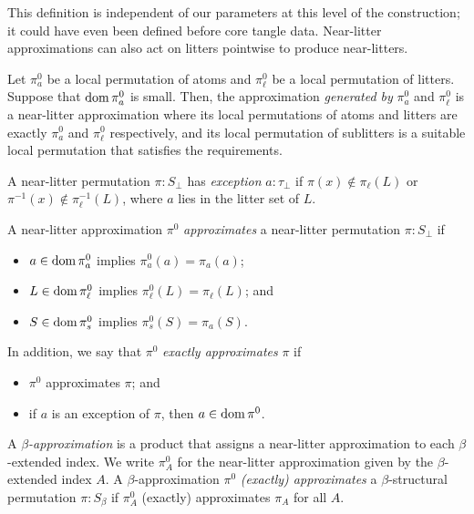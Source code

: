 \documentclass{article}
\begin{document}
\begin{remark}
    This definition is independent of our parameters at this level of the construction; it could have even been defined before core tangle data.
    Near-litter approximations can also act on litters pointwise to produce near-litters.
\end{remark}
\begin{definition}
    Let \( \pi^0_a \) be a local permutation of atoms and \( \pi^0_\ell \) be a local permutation of litters.
    Suppose that \( \operatorname{dom} \pi^0_a \) is small.
    Then, the approximation \emph{generated by} \( \pi^0_a \) and \( \pi^0_\ell \) is a near-litter approximation where its local permutations of atoms and litters are exactly \( \pi^0_a \) and \( \pi^0_\ell \) respectively, and its local permutation of sublitters is a suitable local permutation that satisfies the requirements.
\end{definition}
\begin{definition}
    A near-litter permutation \( \pi : S_\bot \) has \emph{exception} \( a : \tau_\bot \) if \( \pi(x) \not\in \pi_\ell(L) \) or \( \pi^{-1}(x) \not\in \pi^{-1}_\ell(L) \), where \( a \) lies in the litter set of \( L \).
\end{definition}
\begin{definition}
    A near-litter approximation \( \pi^0 \) \emph{approximates} a near-litter permutation \( \pi : S_\bot \) if
    \begin{itemize}
        \item \( a \in \operatorname{dom} \pi^0_a \) implies \( \pi^0_a(a) = \pi_a(a) \);
        \item \( L \in \operatorname{dom} \pi^0_\ell \) implies \( \pi^0_\ell(L) = \pi_\ell(L) \); and
        \item \( S \in \operatorname{dom} \pi^0_s \) implies \( \pi^0_s(S) = \pi_a(S) \).
    \end{itemize}
    In addition, we say that \( \pi^0 \) \emph{exactly approximates} \( \pi \) if
    \begin{itemize}
        \item \( \pi^0 \) approximates \( \pi \); and
        \item if \( a \) is an exception of \( \pi \), then \( a \in \operatorname{dom} \pi^0 \).
    \end{itemize}
\end{definition}
\begin{definition}
    A \emph{\( \beta \)-approximation} is a product that assigns a near-litter approximation to each \( \beta \)-extended index.
    We write \( \pi^0_A \) for the near-litter approximation given by the \( \beta \)-extended index \( A \).
    A \( \beta \)-approximation \( \pi^0 \) \emph{(exactly) approximates} a \( \beta \)-structural permutation \( \pi : S_\beta \) if \( \pi^0_A \) (exactly) approximates \( \pi_A \) for all \( A \).
\end{definition}
\end{document}
